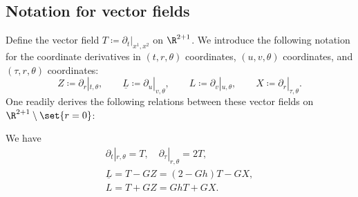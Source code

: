 \documentclass[10pt, reqno]{amsart}
\begin{document}
\subsection{Notation for vector fields}
Define the vector field \(T\coloneqq{}\partial{}_t|_{x^1,x^2}\) on \(\R^{2 + 1}\). We introduce
the following notation for the coordinate derivatives in \((t,r,\theta{})\)
coordinates, \((u,v,\theta{})\) coordinates, and \((\tau{},r,\theta{})\) coordinates:
\begin{equation}
Z\coloneqq{}\partial{}_r|_{t,\theta{}},\qquad \underline{L}\coloneqq{}\partial{}_u|_{v,\theta{}},\qquad L\coloneqq{}\partial{}_v|_{u,\theta{}},\qquad X\coloneqq{}\partial{}_r|_{\tau{},\theta{}}.
\end{equation}
One readily derives the following relations between these vector fields on \(\R^{2 + 1}\setminus \set{r=0}\):
\begin{lemma}
We have
\begin{gather}
\partial{}_t|_{r,\theta{}} = T,\quad \partial{}_\tau{}|_{r,\theta{}} = 2T, \\
\underline{L} = T-GZ = (2-Gh)T - GX, \\
L = T+GZ = GhT + GX.
\end{gather}
\label{vector-field-relations}
\end{lemma}
\end{document}
